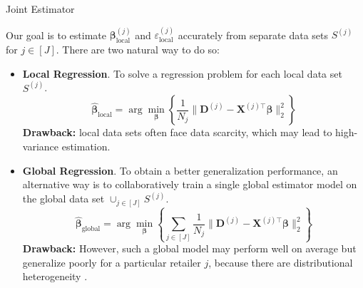 \documentclass{beamer}
\newcommand{\mb}[1]{{\mathbf{#1}}}
\newcommand{\txrd}[1]{{\textcolor{sintefred}{\textbf{#1}}}}
\begin{document}
\begin{frame}{Joint Estimator}

Our goal is to estimate $ {\bm \beta}^{(j)}_{\text{local}}$ and $\varepsilon_{\text{local}}^{(j)}$ accurately from separate data sets $S^{(j)}$ for $j \in [J]$. There are two natural way to do so:

\begin{itemize}
    \item \txrd{Local Regression}. To solve a regression problem for each local data set $S^{(j)}$. 
    {\large
    \[
        \hat{\bm \beta}_{\text{local}} = \arg \min_{\bm \beta} \left\{\frac{1}{N_j} \|\mb D^{(j)}  - \mb X^{(j) \top} {\bm \beta}  \|_2^2 \right\}
    \]}
    \txrd{Drawback:} local data sets often face data scarcity, which may lead to high-variance estimation. 
    \item \txrd{Global Regression}. To obtain a better generalization performance, an alternative way is to collaboratively train a single global estimator model on the global data set $\cup_{j \in [J]} S^{(j)}$. 
    {\large
    \[
    \hat{\bm \beta}_{\text{global}} = \arg \min_{\bm \beta} \left\{ \sum_{j \in [J]} \frac{1}{N_j} \|\mb D^{(j)}  - \mb X^{(j) \top} {\bm \beta}  \|_2^2 \right\}
    \]}
    \txrd{Drawback:} However, such a global model may perform well on average but generalize poorly for a particular retailer $j$, because there are distributional heterogeneity \citep{guo2025statistical, mo2024minimax}.
\end{itemize}
\end{frame}

\end{document}
